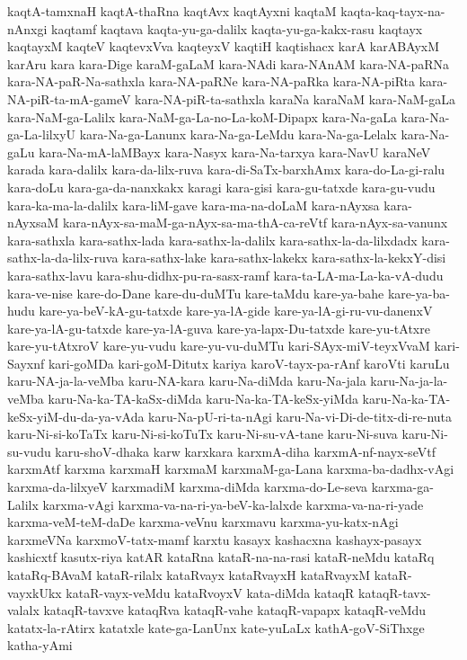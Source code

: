 {kaqtA-tamxnaH
kaqtA-thaRna
kaqtAvx
kaqtAyxni
kaqtaM
kaqta-kaq-tayx-na-nAnxgi
kaqtamf
kaqtava
kaqta-yu-ga-dalilx
kaqta-yu-ga-kakx-rasu
kaqtayx
kaqtayxM
kaqteV
kaqtevxVva
kaqteyxV
kaqtiH
kaqtishacx
karA
karABAyxM
karAru
kara
kara-Dige
karaM-gaLaM
kara-NAdi
kara-NAnAM
kara-NA-paRNa
kara-NA-paR-Na-sathxla
kara-NA-paRNe
kara-NA-paRka
kara-NA-piRta
kara-NA-piR-ta-mA-gameV
kara-NA-piR-ta-sathxla
karaNa
karaNaM
kara-NaM-gaLa
kara-NaM-ga-Lalilx
kara-NaM-ga-La-no-La-koM-Dipapx
kara-Na-gaLa
kara-Na-ga-La-lilxyU
kara-Na-ga-Lanunx
kara-Na-ga-LeMdu
kara-Na-ga-Lelalx
kara-Na-gaLu
kara-Na-mA-laMBayx
kara-Nasyx
kara-Na-tarxya
kara-NavU
karaNeV
karada
kara-dalilx
kara-da-lilx-ruva
kara-di-SaTx-barxhAmx
kara-do-La-gi-ralu
kara-doLu
kara-ga-da-nanxkakx
karagi
kara-gisi
kara-gu-tatxde
kara-gu-vudu
kara-ka-ma-la-dalilx
kara-liM-gave
kara-ma-na-doLaM
kara-nAyxsa
kara-nAyxsaM
kara-nAyx-sa-maM-ga-nAyx-sa-ma-thA-ca-reVtf
kara-nAyx-sa-vanunx
kara-sathxla
kara-sathx-lada
kara-sathx-la-dalilx
kara-sathx-la-da-lilxdadx
kara-sathx-la-da-lilx-ruva
kara-sathx-lake
kara-sathx-lakekx
kara-sathx-la-kekxY-disi
kara-sathx-lavu
kara-shu-didhx-pu-ra-sasx-ramf
kara-ta-LA-ma-La-ka-vA-dudu
kara-ve-nise
kare-do-Dane
kare-du-duMTu
kare-taMdu
kare-ya-bahe
kare-ya-ba-hudu
kare-ya-beV-kA-gu-tatxde
kare-ya-lA-gide
kare-ya-lA-gi-ru-vu-danenxV
kare-ya-lA-gu-tatxde
kare-ya-lA-guva
kare-ya-lapx-Du-tatxde
kare-yu-tAtxre
kare-yu-tAtxroV
kare-yu-vudu
kare-yu-vu-duMTu
kari-SAyx-miV-teyxVvaM
kari-Sayxnf
kari-goMDa
kari-goM-Ditutx
kariya
karoV-tayx-pa-rAnf
karoVti
karuLu
karu-NA-ja-la-veMba
karu-NA-kara
karu-Na-diMda
karu-Na-jala
karu-Na-ja-la-veMba
karu-Na-ka-TA-kaSx-diMda
karu-Na-ka-TA-keSx-yiMda
karu-Na-ka-TA-keSx-yiM-du-da-ya-vAda
karu-Na-pU-ri-ta-nAgi
karu-Na-vi-Di-de-titx-di-re-nuta
karu-Ni-si-koTaTx
karu-Ni-si-koTuTx
karu-Ni-su-vA-tane
karu-Ni-suva
karu-Ni-su-vudu
karu-shoV-dhaka
karw
karxkara
karxmA-diha
karxmA-nf-nayx-seVtf
karxmAtf
karxma
karxmaH
karxmaM
karxmaM-ga-Lana
karxma-ba-dadhx-vAgi
karxma-da-lilxyeV
karxmadiM
karxma-diMda
karxma-do-Le-seva
karxma-ga-Lalilx
karxma-vAgi
karxma-va-na-ri-ya-beV-ka-lalxde
karxma-va-na-ri-yade
karxma-veM-teM-daDe
karxma-veVnu
karxmavu
karxma-yu-katx-nAgi
karxmeVNa
karxmoV-tatx-mamf
karxtu
kasayx
kashacxna
kashayx-pasayx
kashicxtf
kasutx-riya
katAR
kataRna
kataR-na-na-rasi
kataR-neMdu
kataRq
kataRq-BAvaM
kataR-rilalx
kataRvayx
kataRvayxH
kataRvayxM
kataR-vayxkUkx
kataR-vayx-veMdu
kataRvoyxV
kata-diMda
kataqR
kataqR-tavx-valalx
kataqR-tavxve
kataqRva
kataqR-vahe
kataqR-vapapx
kataqR-veMdu
katatx-la-rAtirx
katatxle
kate-ga-LanUnx
kate-yuLaLx
kathA-goV-SiThxge
katha-yAmi
}
